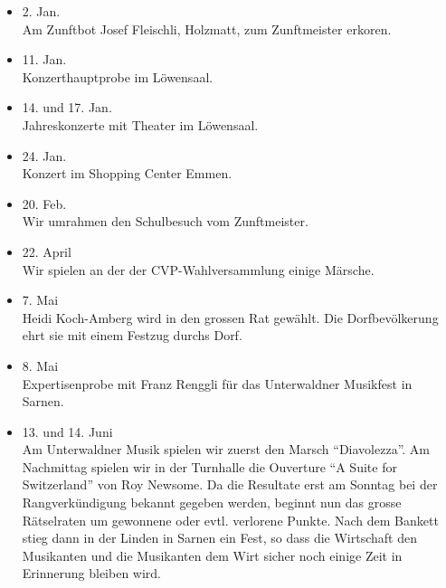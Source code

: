 \begin{history}


    \begin{itemize}

        \item[]2. Jan.\\
        Am Zunftbot Josef Fleischli, Holzmatt, zum Zunftmeister erkoren.

        \item[]11. Jan.\\
        Konzerthauptprobe im Löwensaal.

        \item[]14. und 17. Jan.\\
        Jahreskonzerte mit Theater im Löwensaal.

        \item[]24. Jan.\\
        Konzert im Shopping Center Emmen.

        \item[]20. Feb.\\
        Wir umrahmen den Schulbesuch vom Zunftmeister.

        \item[]22. April\\
        Wir spielen an der der CVP-Wahlversammlung einige Märsche.

        \item[]7. Mai\\
        Heidi Koch-Amberg wird in den grossen Rat gewählt. Die Dorfbevölkerung
        ehrt sie mit einem Festzug durchs Dorf.

        \item[]8. Mai\\
        Expertisenprobe mit Franz Renggli für das Unterwaldner Musikfest in
        Sarnen.

        \item[]13. und 14. Juni\\
        Am Unterwaldner Musik spielen wir zuerst den Marsch
        \enquote{Diavolezza}. Am Nachmittag spielen wir in der Turnhalle die
        Ouverture \enquote{A Suite for Switzerland} von Roy Newsome. Da die
        Resultate erst am Sonntag bei der Rangverkündigung bekannt gegeben
        werden, beginnt nun das grosse Rätselraten um gewonnene oder evtl.
        verlorene Punkte. Nach dem Bankett stieg dann in der Linden in Sarnen
        ein Fest, so dass die Wirtschaft den Musikanten und die Musikanten dem
        Wirt sicher noch einige Zeit in Erinnerung bleiben wird.


\end{itemize}
\end{history}
